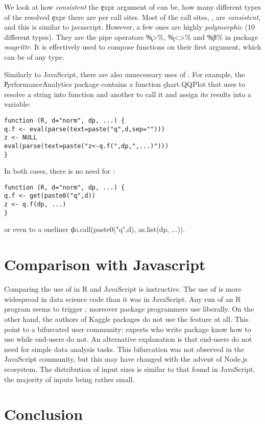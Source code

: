 \documentclass[USenglish,cleveref, autoref, thm-restate]{lipics-v2019}
\begin{document}
We look at how \emph{consistent} the \c{expr} argument of \eval can
be, \ie how many different types of the resolved \c{expr} there are
per call sites. Most of the call sites, \ie \PercentMonomorphic, are
\emph{consistent}, and this is similar to javascript. However, a few
ones are highly \emph{polymorphic} (10 different types). They are the
pipe operators \c{\%>\%}, \c{\%<>\%} and \c{\%\$\%} in package
\emph{magrittr}. It is effectively used to compose functions on their
first argument, which can be of any type.


Similarly to JavaScript, there are also unnecessary uses of \eval. For
example, the \c{PerformanceAnalytics} package contains a function
\c{chart.QQPlot} that uses \eval to resolve a string into function and
another to call it and assign its results into a variable:
\begin{lstlisting}
function (R, d="norm", dp, ...) {
q.f <- eval(parse(text=paste("q",d,sep="")))
z <- NULL
eval(parse(text=paste("z<-q.f(",dp,",...)")))
}
\end{lstlisting}
  In both cases, there is no need for \eval:
\begin{lstlisting}
function (R, d="norm", dp, ...) {
q.f <- get(paste0("q",d))
z <- q.f(dp, ...)
}
\end{lstlisting}
  or even to a oneliner \c{do.call(paste0("q",d), as.list(dp, ...))}.

\section{Comparison with Javascript}

Comparing the use of \eval in R and JavaScript is instructive. The use
of \eval is more widespread in data science code than it was in
JavaScript. Any run of an R program seems to trigger \eval; moreover
package programmers use \eval liberally. On the other hand, the
authors of Kaggle packages do not use the feature at all. This point
to a bifurcated user community: experts who write package know how to
use \eval while end-users do not. An alternative explanation is that
end-users do not need \eval for simple data analysis tasks. This
bifurcation was not observed in the JavaScript community, but this may
have changed with the advent of Node.js ecosystem. The distribution of
input sizes is similar to that found in JavaScript, the majority of
inputs being rather small.



\section{Conclusion}




\end{document}
